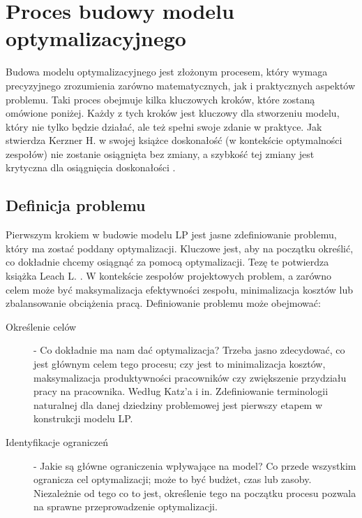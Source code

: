 \section{Proces budowy modelu optymalizacyjnego}
\par Budowa modelu optymalizacyjnego jest złożonym procesem, który wymaga precyzyjnego zrozumienia zarówno matematycznych, jak i praktycznych aspektów problemu. Taki proces obejmuje kilka kluczowych kroków, które zostaną omówione poniżej. Każdy z tych kroków jest kluczowy dla stworzeniu modelu, który nie tylko będzie działać, ale też spełni swoje zdanie w praktyce. Jak stwierdza Kerzner H. w swojej książce doskonałość (w kontekście optymalności zespołów) nie zostanie osiągnięta bez zmiany, a szybkość tej zmiany jest krytyczna dla osiągnięcia doskonałości \parencite{kerzner2003advanced}.
    \subsection{Definicja problemu}
    \par Pierwszym krokiem w budowie modelu LP jest jasne zdefiniowanie problemu, który ma zostać poddany optymalizacji. Kluczowe jest, aby na początku określić, co dokładnie chcemy osiągnąć za pomocą optymalizacji. Tezę te potwierdza książka Leach L. \parencite{leach2014critical}. W kontekście zespołów projektowych problem, a zarówno celem może być maksymalizacja efektywności zespołu, minimalizacja kosztów lub zbalansowanie obciążenia pracą. Definiowanie problemu może obejmować:
    \begin{description}
        \item[Określenie celów] - Co dokładnie ma nam dać optymalizacja? Trzeba jasno zdecydować, co jest głównym celem tego procesu; czy jest to minimalizacja kosztów, maksymalizacja produktywności pracowników czy zwiększenie przydziału pracy na pracownika. Według Katz'a i in. \parencite{katz1980system} Zdefiniowanie terminologii naturalnej dla danej dziedziny problemowej jest pierwszy etapem w konstrukcji modelu LP.
        \item[Identyfikacje ograniczeń] -  Jakie są główne ograniczenia wpływające na model? Co przede wszystkim ogranicza cel optymalizacji; może to być budżet, czas lub zasoby. Niezależnie od tego co to jest, określenie tego na początku procesu pozwala na sprawne przeprowadzenie optymalizacji.
    \end{description}

